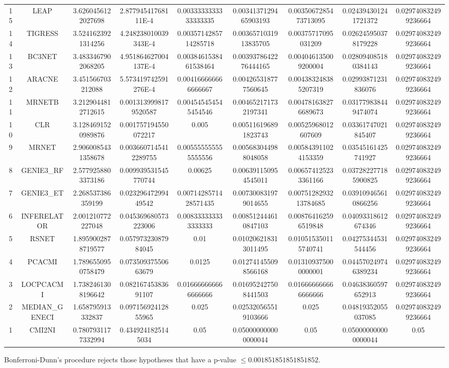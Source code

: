 \documentclass[a4paper,10pt]{article}
\begin{document}
\begin{landscape}
\begin{table}[!htp]
\begin{tabular}{ccccccccc}
15&LEAP&3.6260456122027698&2.87794541768111E-4&0.0033333333333333335&0.0034137129465903193&0.0035067285473713095&0.024394301241721372&0.029740832499236664\\
14&TIGRESS&3.5241623921314256&4.248238010039343E-4&0.0035714285714285718&0.0036571031913835705&0.00375717095031209&0.026245950378179228&0.029740832499236664\\
13&BC3NET&3.4833467902068205&4.951864627004137E-4&0.0038461538461538464&0.0039378642276444165&0.004046135009200004&0.028094085180384143&0.029740832499236664\\
12&ARACNE&3.451566703212088&5.573419742591276E-4&0.004166666666666667&0.004265318777560645&0.004383248385207319&0.02993871231836076&0.029740832499236664\\
11&MRNETB&3.2129044812712615&0.0013139998179520587&0.004545454545454546&0.004652171732197341&0.004781638276689673&0.031779838449474074&0.029740832499236664\\
10&CLR&3.1284691520989876&0.001757194550072217&0.005&0.005116196891823743&0.00525968012607609&0.03361747021845407&0.029740832499236664\\
9&MRNET&2.9060085431358678&0.0036607145412289755&0.005555555555555556&0.005683044988048058&0.005843911024153359&0.03545161425741927&0.029740832499236664\\
8&GENIE3_RF&2.5779258803373186&0.009939531545770744&0.00625&0.006391150954545011&0.006574125233361166&0.037282277185900825&0.029740832499236664\\
7&GENIE3_ET&2.268537386359199&0.02329647299449542&0.0071428571428571435&0.007300831979014655&0.0075128293213784685&0.039109465610866256&0.029740832499236664\\
6&INFERELATOR&2.001210772227048&0.045369680573223006&0.008333333333333333&0.008512444610847103&0.008764162596519848&0.04093318612674346&0.029740832499236664\\
5&RSNET&1.8959002878719577&0.05797323087984045&0.01&0.010206218313011495&0.010515350115740741&0.04275344531544456&0.029740832499236664\\
4&PCACMI&1.7896550950758479&0.07350937550663679&0.0125&0.012741455098566168&0.013109375000000001&0.044570249746389234&0.029740832499236664\\
3&LOCPCACMI&1.7382461308196642&0.08216745383691107&0.016666666666666666&0.016952427508441503&0.016666666666666666&0.04638360597652913&0.029740832499236664\\
2&MEDIAN_GENECI&1.658795913332837&0.09715692412855965&0.025&0.025320565519103666&0.025&0.04819352055037085&0.029740832499236664\\
1&CMI2NI&0.7807931177332994&0.4349241825145034&0.05&0.050000000000000044&0.05&0.050000000000000044&0.05\\
\hline
\end{tabular}
\end{table}
Bonferroni-Dunn's procedure rejects those hypotheses that have a p-value $\le0.001851851851851852$.



\end{landscape}
\end{document}
